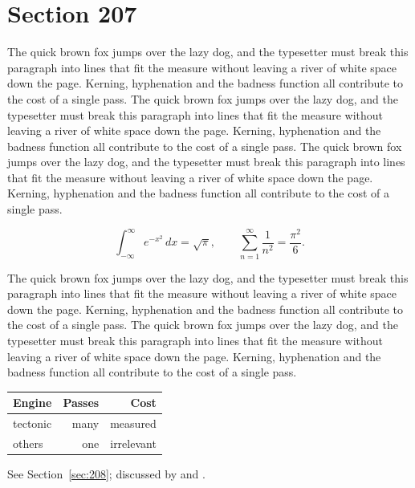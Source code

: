\documentclass{article}
\begin{document}
\section{Section 207}
\label{sec:207}
The quick brown fox jumps over the lazy dog, and the typesetter must break this paragraph into lines that fit the measure without leaving a river of white space down the page. Kerning, hyphenation and the badness function all contribute to the cost of a single pass. The quick brown fox jumps over the lazy dog, and the typesetter must break this paragraph into lines that fit the measure without leaving a river of white space down the page. Kerning, hyphenation and the badness function all contribute to the cost of a single pass. The quick brown fox jumps over the lazy dog, and the typesetter must break this paragraph into lines that fit the measure without leaving a river of white space down the page. Kerning, hyphenation and the badness function all contribute to the cost of a single pass. 

\begin{equation}\label{eq:207}
\int_{-\infty}^{\infty} e^{-x^{2}}\,dx = \sqrt{\pi}, \qquad
\sum_{n=1}^{\infty} \frac{1}{n^{2}} = \frac{\pi^{2}}{6}.
\end{equation}

The quick brown fox jumps over the lazy dog, and the typesetter must break this paragraph into lines that fit the measure without leaving a river of white space down the page. Kerning, hyphenation and the badness function all contribute to the cost of a single pass. The quick brown fox jumps over the lazy dog, and the typesetter must break this paragraph into lines that fit the measure without leaving a river of white space down the page. Kerning, hyphenation and the badness function all contribute to the cost of a single pass. 

\begin{center}
\begin{tabular}{lrr}
\toprule
Engine & Passes & Cost \\
\midrule
tectonic & many & measured \\
others & one & irrelevant \\
\bottomrule
\end{tabular}
\end{center}

See Section~\ref{sec:208}; discussed by \textcite{k3} and \textcite{l5}.
\end{document}
